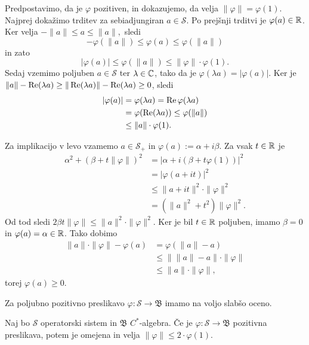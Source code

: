 \begin{dokaz}
    Predpostavimo, da je $\varphi$ pozitiven, in dokazujemo, da velja $\| \varphi\| = \varphi(1)$.
    Najprej dokažimo trditev za sebiadjungiran $a \in \mathcal{S}$.
    Po prejšnji trditvi je $\varphi(a) \in \mathbb R$. Ker velja
    $-\| a\| \leq a\leq \| a\|,$
    sledi 
    $$-\varphi(\| a\|) \leq \varphi(a) \leq \varphi(\|a\|)$$
    in zato $$|\varphi(a)| \leq \varphi(\| a\|) \leq \| \varphi \| \cdot \varphi (1).$$
    Sedaj vzemimo poljuben $a \in \mathcal{S}$ ter $\lambda \in \mathbb C$,
    tako da je $\varphi(\lambda a) = |\varphi (a)|$. Ker je $\| a\| - \operatorname{Re}(\lambda a) \geq \| \operatorname{Re} (\lambda a)\| - \operatorname{Re}(\lambda a) \geq 0$,
    sledi \begin{align*}
        |\varphi(a)| &= \varphi(\lambda a) = \operatorname{Re} \varphi(\lambda a)\\ 
        &= \varphi(\operatorname{Re} (\lambda a)) \leq \varphi(\| a\|)\\ 
        &\leq \| a\| \cdot \varphi(1).
    \end{align*}

    Za implikacijo v levo vzamemo
    $a \in \mathcal{S}_+$ in $\varphi (a) := \alpha + i \beta.$
    Za vsak $t \in \mathbb R$ je
  \begin{align*}
    \alpha^2 + (\beta + t \|\varphi\|)^2 &= |\alpha + i (\beta + t \varphi(1))|^2\\
    &= |\varphi (a + it)|^2\\
    &\leq \| a + it\|^2 \cdot \|\varphi\|^2 \\
    &= \left( \|a\|^2 + t^2 \right) \|\varphi\|^2. 
  \end{align*}
    Od tod sledi $2 \beta t \|\varphi\| \leq \|a\|^2 \cdot \|\varphi\|^2$.
    Ker je bil $t \in \mathbb R$ poljuben, imamo $\beta = 0$ in $\varphi(a) = \alpha \in \mathbb R$.
    Tako dobimo
    \begin{align*}
        \| a\| \cdot \|\varphi\| - \varphi(a) &= \varphi(\|a\| - a)\\
        &\leq \|\|a\| - a\| \cdot \|\varphi\|\\
        &\leq \| a\| \cdot \| \varphi \|,
    \end{align*}
    torej $\varphi(a) \geq 0$.
\end{dokaz}

Za poljubno pozitivno preslikavo $\varphi: \mathcal{S} \to \mathfrak{B}$ imamo na voljo slabšo oceno.

\begin{trditev}\label{trd:1.1}
    Naj bo $\mathcal{S}$ operatorski sistem in $\mathfrak{B}$ $C^*$-algebra.
    Če je $\varphi: \mathcal{S} \to \mathfrak{B}$ pozitivna preslikava, potem je omejena in velja 
    $\| \varphi\| \leq 2 \cdot \varphi(1)$.
\end{trditev}

